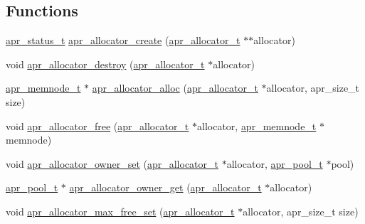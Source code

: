 \subsection*{Functions}
\begin{DoxyCompactItemize}
\item 
\hyperlink{group__apr__errno_gaf76ee4543247e9fb3f3546203e590a6c}{apr\-\_\-status\-\_\-t} \hyperlink{group__apr__allocator_gaf834f409a34b7f8656c045cff02fd953}{apr\-\_\-allocator\-\_\-create} (\hyperlink{group__apr__allocator_ga1ceabfd30fcfc455e47d052d2a24244b}{apr\-\_\-allocator\-\_\-t} $\ast$$\ast$allocator)
\item 
void \hyperlink{group__apr__allocator_ga704529f6b26279ad1c48d5e8372d859c}{apr\-\_\-allocator\-\_\-destroy} (\hyperlink{group__apr__allocator_ga1ceabfd30fcfc455e47d052d2a24244b}{apr\-\_\-allocator\-\_\-t} $\ast$allocator)
\item 
\hyperlink{structapr__memnode__t}{apr\-\_\-memnode\-\_\-t} $\ast$ \hyperlink{group__apr__allocator_ga7452b0837c2148bd63109f89bbc0c3db}{apr\-\_\-allocator\-\_\-alloc} (\hyperlink{group__apr__allocator_ga1ceabfd30fcfc455e47d052d2a24244b}{apr\-\_\-allocator\-\_\-t} $\ast$allocator, apr\-\_\-size\-\_\-t size)
\item 
void \hyperlink{group__apr__allocator_ga124e48339838213fd5e160a4125cb7e8}{apr\-\_\-allocator\-\_\-free} (\hyperlink{group__apr__allocator_ga1ceabfd30fcfc455e47d052d2a24244b}{apr\-\_\-allocator\-\_\-t} $\ast$allocator, \hyperlink{structapr__memnode__t}{apr\-\_\-memnode\-\_\-t} $\ast$memnode)
\item 
void \hyperlink{group__apr__allocator_gadf38bbec37c29c24388e95b1c9acad28}{apr\-\_\-allocator\-\_\-owner\-\_\-set} (\hyperlink{group__apr__allocator_ga1ceabfd30fcfc455e47d052d2a24244b}{apr\-\_\-allocator\-\_\-t} $\ast$allocator, \hyperlink{group__apr__pools_gaf137f28edcf9a086cd6bc36c20d7cdfb}{apr\-\_\-pool\-\_\-t} $\ast$pool)
\item 
\hyperlink{group__apr__pools_gaf137f28edcf9a086cd6bc36c20d7cdfb}{apr\-\_\-pool\-\_\-t} $\ast$ \hyperlink{group__apr__allocator_ga3cfe48c8717de6495480ce1479d262f1}{apr\-\_\-allocator\-\_\-owner\-\_\-get} (\hyperlink{group__apr__allocator_ga1ceabfd30fcfc455e47d052d2a24244b}{apr\-\_\-allocator\-\_\-t} $\ast$allocator)
\item 
void \hyperlink{group__apr__allocator_ga1d45cb6dbe69ba25dee0ec5f4e031d60}{apr\-\_\-allocator\-\_\-max\-\_\-free\-\_\-set} (\hyperlink{group__apr__allocator_ga1ceabfd30fcfc455e47d052d2a24244b}{apr\-\_\-allocator\-\_\-t} $\ast$allocator, apr\-\_\-size\-\_\-t size)
$$
\end{DoxyCompactItemize}
